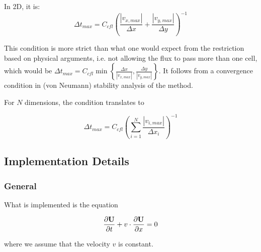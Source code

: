 In 2D, it is:
\begin{equation}
	\Delta t_{max} = C_{cfl} \left( \frac{|v_{x,max}|}{\Delta x} +  \frac{|v_{y,max}|}{\Delta y} \right)^{-1} \label{eq:CFL2D}
\end{equation}

This condition is more strict than what one would expect from the restriction based on physical arguments, i.e. not allowing the flux to pass more than one cell, which would be $\Delta t_{max} = C_{cfl} \min \left\{ \frac{\Delta x}{|v_{x,max}|} ,  \frac{\Delta y}{|v_{y,max}|} \right\} $.
It follows from a convergence condition in (von Neumann) stability analysis of the method.

For $N$ dimensions, the condition translates to

\begin{equation}
	\Delta t_{max} = C_{cfl} \left( \sum_{i=1}^{N} \frac{|v_{i,max}|}{\Delta x_i} \right)^{-1}  \label{eq:CFLND}
\end{equation}






















\subsection{Implementation Details}






\subsubsection{General}


What is implemented is the equation

\begin{equation}
    \frac{\partial \mathbf{U}}{\partial t} + v \cdot \frac{\partial \mathbf{U}}{\partial x} = 0
\end{equation}


where we assume that the velocity $v$ is constant.

